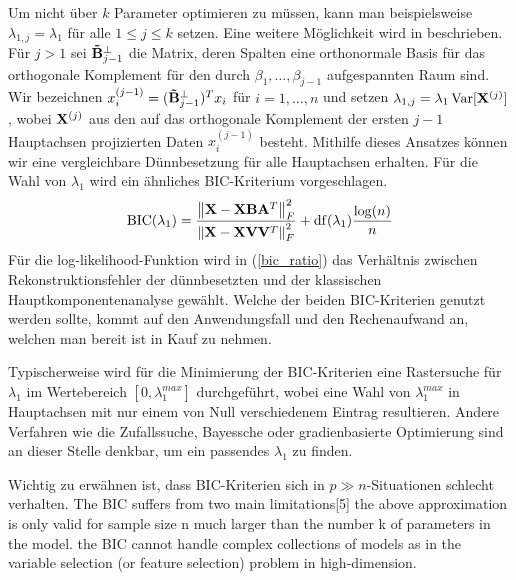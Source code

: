 Um nicht über $k$ Parameter optimieren zu müssen, kann man beispielsweise $\lambda_{1,j} = \lambda_1$ für alle $1 \leq j \leq k$ setzen. Eine weitere Möglichkeit wird in \cite{croux} beschrieben. Für $j>1$ sei $\mathbf{\tilde{B}}_{j-1}^{\perp}$ die Matrix, deren Spalten eine orthonormale Basis für das orthogonale Komplement für den durch $\beta_1, \ldots, \beta_{j-1}$ aufgespannten Raum sind. Wir bezeichnen $x_i^{(j-1)} = (\mathbf{\tilde{B}}_{j-1}^{\perp})^T x_i$ für $i = 1, \ldots, n$ und setzen $\lambda_{1,j} = \lambda_1\operatorname{Var}[\mathbf{X}^{(j)}]$, wobei $\mathbf{X}^{(j)}$ aus den auf das orthogonale Komplement der ersten $j-1$ Hauptachsen projizierten Daten $x_i^{(j-1)}$ besteht. Mithilfe dieses Ansatzes können wir eine vergleichbare Dünnbesetzung für alle Hauptachsen erhalten. Für die Wahl von $\lambda_1$ wird ein ähnliches BIC-Kriterium vorgeschlagen.
\begin{align}
\label{bic_ratio}
\operatorname{BIC}(\lambda_1) = \frac{\left\lVert \mathbf{X} - \mathbf{X} \mathbf{B} \mathbf{A}^T \right\rVert_{F}^{2}}{\left\lVert \mathbf{X} - \mathbf{X} \mathbf{V} \mathbf{V}^T \right\rVert_{F}^{2}} + \operatorname{df}(\lambda_1) \frac{\log(n)}{n}
\end{align}
Für die log-likelihood-Funktion wird in (\ref{bic_ratio}) das Verhältnis zwischen Rekonstruktionsfehler der dünnbesetzten und der klassischen Hauptkomponentenanalyse gewählt. Welche der beiden BIC-Kriterien genutzt werden sollte, kommt auf den Anwendungsfall und den Rechenaufwand an, welchen man bereit ist in Kauf zu nehmen.

Typischerweise wird für die Minimierung der BIC-Kriterien eine Rastersuche für $\lambda_1$ im Wertebereich $[0, \lambda_1^{max}]$ durchgeführt, wobei eine Wahl von $\lambda_1^{max}$ in Hauptachsen mit nur einem von Null verschiedenem Eintrag resultieren. Andere Verfahren wie die Zufallssuche, Bayessche oder gradienbasierte Optimierung sind an dieser Stelle denkbar, um ein passendes $\lambda_1$ zu finden. 

Wichtig zu erwähnen ist, dass BIC-Kriterien sich in $p \gg n$-Situationen schlecht verhalten.
The BIC suffers from two main limitations[5]
the above approximation is only valid for sample size n much larger than the number k of parameters in the model.
the BIC cannot handle complex collections of models as in the variable selection (or feature selection) problem in high-dimension. 




